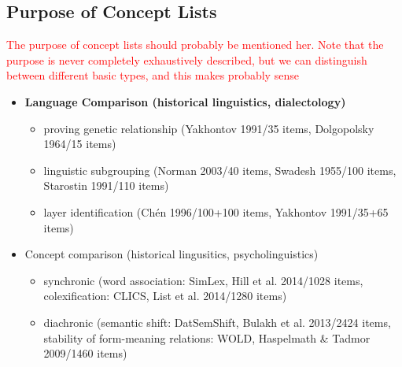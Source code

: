 \documentclass[10pt, a4paper]{article}
\begin{document}
\subsection{Purpose of Concept Lists}
\textcolor{red}{The purpose of concept lists should probably be mentioned her. Note that the purpose
is never completely exhaustively described, but we can distinguish between different basic types,
and this makes probably sense}
\begin{itemize}
  \item {\bf Language Comparison (historical linguistics, dialectology)}
    \begin{itemize}
      \item proving genetic relationship (Yakhontov 1991/35 items, Dolgopolsky 1964/15 items)
      \item linguistic subgrouping (Norman 2003/40 items, Swadesh 1955/100 items, Starostin 1991/110 items)
      \item layer identification (Chén 1996/100+100 items, Yakhontov 1991/35+65 items)
    \end{itemize}
  \item Concept comparison (historical lingusitics, psycholinguistics)
    \begin{itemize}
      \item synchronic (word association: SimLex, Hill et al. 2014/1028 items,
	colexification: CLICS, List et al. 2014/1280 items)
      \item diachronic (semantic shift: DatSemShift, Bulakh et al. 2013/2424
	items, stability of form-meaning relations: WOLD, Haspelmath \&
	Tadmor 2009/1460 items)
    \end{itemize}
\end{itemize}
\end{document}
